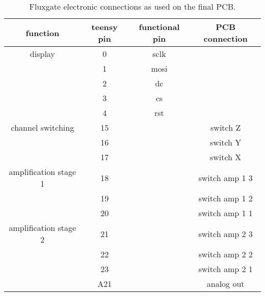             \begin{table}
                \centering
                \begin{tabular}{|c|c|c|c|}
                    \hline
                    function & teensy pin & functional pin& PCB connection  \\
                    \hline
                    display&0 & sclk&\\
                    &1 & mosi&\\
                    &2 & dc&\\
                    &3 & cs&\\
                    &4 & rst&\\
                    \hline
                    channel switching&15 & & switch Z\\
                    &16 & & switch Y\\
                    &17 & & switch X\\
                    \hline
                    amplification stage 1&18 & & switch amp 1 3\\
                    &19 & & switch amp 1 2\\
                    &20 & & switch amp 1 1\\
                    \hline
                    amplification stage 2&21 & & switch amp 2 3\\
                    &22 & & switch amp 2 2\\
                    &23 & & switch amp 2 1\\
                    &A21 & & analog out\\
                    \hline
                \end{tabular}
                \caption[Fluxgate connections]{Fluxgate electronic connections as used on the final PCB.}
                \label{table:matMeth:fluxgateConnections}
            \end{table}
